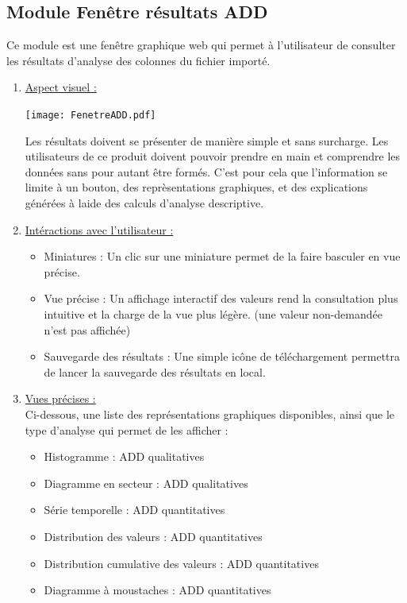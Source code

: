 			
		\subsection{Module Fenêtre résultats ADD}
			Ce module est une fenêtre graphique web qui permet à l'utilisateur de consulter les résultats d'analyse des colonnes du fichier importé.
			\begin{enumerate}
				\item \underline{Aspect visuel :}\\
					\begin{center}\texttt{[image: FenetreADD.pdf]}\end{center}
					Les résultats doivent se présenter de manière simple et sans surcharge. Les utilisateurs de ce produit doivent pouvoir prendre en main et comprendre les données sans pour autant être formés. C'est pour cela que l'information se limite à un bouton, des reprèsentations graphiques, et des explications générées à laide des calculs d'analyse descriptive.
				\item \underline{Intéractions avec l'utilisateur :}
					\begin{itemize}
						\item Miniatures : Un clic sur une miniature permet de la faire basculer en vue précise.
						\item Vue précise : Un affichage interactif des valeurs rend la consultation plus intuitive et la charge de la vue plus légère. (une valeur non-demandée n'est pas affichée)
						\item Sauvegarde des résultats : Une simple icône de téléchargement permettra de lancer la sauvegarde des résultats en local.
					\end{itemize}
				\item \underline{Vues précises :}\\
					Ci-dessous, une liste des représentations graphiques disponibles, ainsi que le type d'analyse qui permet de les afficher :
					\begin{itemize}
						\item Histogramme : ADD qualitatives
						\item Diagramme en secteur : ADD qualitatives
						\item Série temporelle : ADD quantitatives
						\item Distribution des valeurs : ADD quantitatives
						\item Distribution cumulative des valeurs : ADD quantitatives
						\item Diagramme à moustaches : ADD quantitatives
					\end{itemize}
			\end{enumerate}
	
